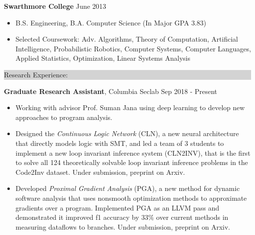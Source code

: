 \documentclass{article} %
\newcommand{\rsection}[1]{
  \hspace{-0.4cm}\vspace{0.1cm}
\colorbox{lightgrey}{
\begin{minipage}{1.07\linewidth}
\vspace{0.22cm}
\fontsize{14pt}{16pt}\selectfont #1 
\vspace{0.12cm}
\end{minipage}
}
\vspace*{-0.1cm}
}
\newcommand{\rjob}[2]{
  \hspace*{-0.3cm}
{\fontsize{10pt}{12pt}\selectfont #1} \hfill #2 
\vspace*{0.1cm} 
\hspace*{-1.2cm}
}
\newenvironment{ritemize}{
\hspace*{-0.8cm} 
\begin{minipage}{1.05\linewidth}
\begin{itemize}
}{
\end{itemize}
\end{minipage}
}
\newcommand{\ritem}{
\item[-]
}
\begin{document}
\rjob{\textbf{Swarthmore College}}{June 2013}\\
\begin{ritemize}
    \ritem B.S. Engineering, B.A. Computer Science (In Major GPA 3.83)
\ritem Selected Coursework: Adv. Algorithms, Theory of Computation, Artificial Intelligence, Probabilistic Robotics, Computer Systems, Computer Languages, Applied Statistics, Optimization, Linear Systems Analysis
\end{ritemize}
\vspace{0.25cm}



\rsection{Research Experience:}

\rjob{\textbf{Graduate Research Assistant}, Columbia Seclab}{Sep 2018 - Present}\\
\begin{ritemize}
    \ritem Working with advisor Prof. Suman Jana using deep learning to develop new approaches to program analysis.
    \ritem Designed the \textit{Continuous Logic Network} (CLN), a new neural architecture that directly models logic with SMT, and led a team of 3 students to implement a new loop invariant inference system (CLN2INV), that is the first to solve all 124 theoretically solvable loop invariant inference problems in the Code2Inv dataset. Under submission, preprint on Arxiv.
  \ritem Developed \textit{Proximal Gradient Analysis} (PGA), a new method for dynamic software analysis that uses nonsmooth optimization methods to approximate gradients over a program. Implemented PGA as an LLVM pass and demonstrated it improved f1 accuracy by 33\% over current methods in measuring dataflows to branches. Under submission, preprint on Arxiv.
\end{ritemize}
\end{document}
